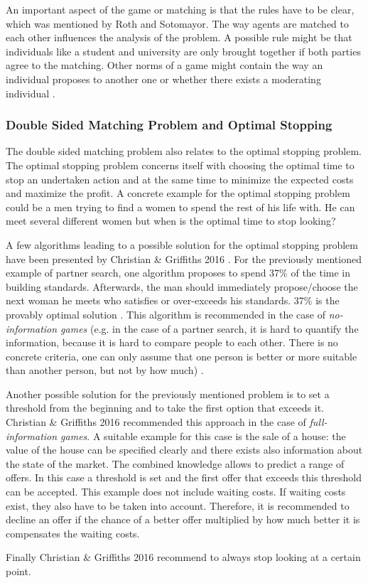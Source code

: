 An important aspect of the game or matching is that the rules have to be clear, which was mentioned by Roth and Sotomayor.
The way agents are matched to each other influences the analysis of the problem.
A possible rule might be that individuals like a student and university are only brought together if both parties agree to the matching.
Other norms of a game might contain the way an individual proposes to another one or whether there exists a moderating individual \cite[p. 492]{roth1992two}.

\clearpage
\subsubsection{Double Sided Matching Problem and Optimal Stopping}
The double sided matching problem also relates to the optimal stopping problem. 
The optimal stopping problem concerns itself with choosing the optimal time to stop an undertaken action and at the same time to minimize the expected costs and maximize the profit. 
A concrete example for the optimal stopping problem could be a men trying to find a women to spend the rest of his life with. 
He can meet several different women but when is the optimal time to stop looking?

A few algorithms leading to a possible solution for the optimal stopping problem have been presented by Christian \& Griffiths 2016 \cite{algtoliveby}. 
For the previously mentioned example of partner search, one algorithm proposes to spend 37\% of the time in building standards. 
Afterwards, the man should immediately propose/choose the next woman he meets who satisfies or over-exceeds his standards.
37\% is the provably optimal solution \cite[p. 2]{algtoliveby}. 
This algorithm is recommended in the case of \textit{no-information games} (e.g. in the case of a partner search, it is hard to quantify the information, because it is hard to compare people to each other. There is no concrete criteria, one can only assume that one person is better or more suitable than another person, but not by how much) \cite[p. 18]{algtoliveby}.

Another possible solution for the previously mentioned problem is to set a threshold from the beginning and to take the first option that exceeds it. 
Christian \& Griffiths 2016 \cite{algtoliveby} recommended this approach in the case of \textit{full-information games}.
A suitable example for this case is the sale of a house: the value of the house can be specified clearly and there exists also information about the state of the market. 
The combined knowledge allows to predict a range of offers. 
In this case a threshold is set and the first offer that exceeds this threshold can be accepted.
This example does not include waiting costs. 
If waiting costs exist, they also have to be taken into account. 
Therefore, it is recommended to decline an offer if the chance of a better offer multiplied by how much better it is compensates the waiting costs.

Finally Christian \& Griffiths 2016 \cite[pp. 28-30]{algtoliveby} recommend to always stop looking at a certain point.



